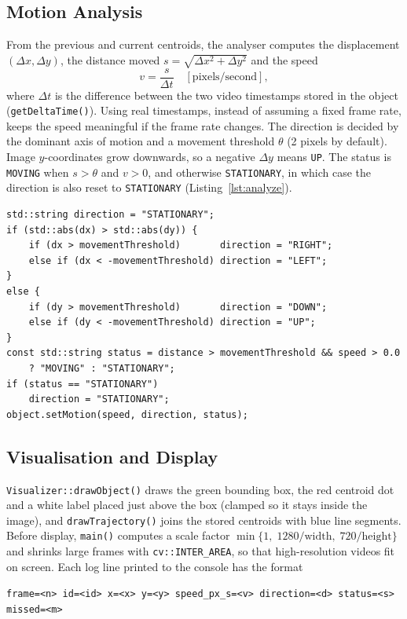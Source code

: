 \documentclass[12pt,a4paper,oneside]{book}
\begin{document}
\subsection{Motion Analysis}
From the previous and current centroids, the analyser computes the displacement $(\Delta x, \Delta y)$, the distance moved $s=\sqrt{\Delta x^2+\Delta y^2}$ and the speed
\begin{equation}
v = \frac{s}{\Delta t}\quad[\text{pixels/second}],
\end{equation}
where $\Delta t$ is the difference between the two video timestamps stored in the object (\texttt{getDeltaTime()}). Using real timestamps, instead of assuming a fixed frame rate, keeps the speed meaningful if the frame rate changes. The direction is decided by the dominant axis of motion and a movement threshold $\theta$ (2 pixels by default). Image $y$-coordinates grow downwards, so a negative $\Delta y$ means \texttt{UP}. The status is \texttt{MOVING} when $s>\theta$ and $v>0$, and otherwise \texttt{STATIONARY}, in which case the direction is also reset to \texttt{STATIONARY} (Listing~\ref{lst:analyze}).

\begin{minipage}{\linewidth}
\begin{lstlisting}[caption={Direction and status logic of \texttt{MotionAnalyzer::analyze()}.}, label={lst:analyze}]
std::string direction = "STATIONARY";
if (std::abs(dx) > std::abs(dy)) {
    if (dx > movementThreshold)       direction = "RIGHT";
    else if (dx < -movementThreshold) direction = "LEFT";
}
else {
    if (dy > movementThreshold)       direction = "DOWN";
    else if (dy < -movementThreshold) direction = "UP";
}
const std::string status = distance > movementThreshold && speed > 0.0
    ? "MOVING" : "STATIONARY";
if (status == "STATIONARY")
    direction = "STATIONARY";
object.setMotion(speed, direction, status);
\end{lstlisting}
\end{minipage}

\subsection{Visualisation and Display}
\texttt{Visualizer::drawObject()} draws the green bounding box, the red centroid dot and a white label placed just above the box (clamped so it stays inside the image), and \texttt{drawTrajectory()} joins the stored centroids with blue line segments. Before display, \texttt{main()} computes a scale factor $\min\{1,\;1280/\text{width},\;720/\text{height}\}$ and shrinks large frames with \texttt{cv::INTER\_AREA}, so that high-resolution videos fit on screen. Each log line printed to the console has the format
\begin{center}
\small\texttt{frame=<n> id=<id> x=<x> y=<y> speed\_px\_s=<v> direction=<d> status=<s> missed=<m>}
\end{center}
\end{document}
